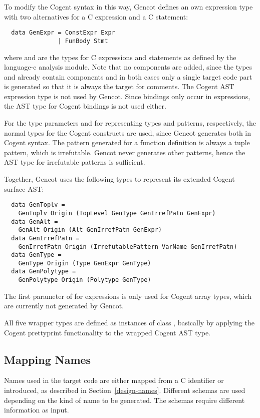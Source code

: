 To modify the Cogent syntax in this way, Gencot defines an own expression type with two alternatives for a C expression 
and a C statement:
\begin{verbatim}
  data GenExpr = ConstExpr Expr
               | FunBody Stmt
\end{verbatim}
where  and  are the types for C expressions and statements as defined by the language-c analysis
module. Note that no  components are added, since the types  and  already contain
 components and in both cases only a single target code part is generated so that it is always the
target for comments. The Cogent AST expression type is not used by Gencot. Since bindings only occur in expressions,
the AST type for Cogent bindings is not used either.

For the type parameters  and  for representing types and patterns, respectively, the normal types for 
the Cogent constructs are used, since Gencot generates both in Cogent syntax. The pattern generated for a function
definition is always a tuple pattern, which is irrefutable. Gencot never generates other patterns, hence the AST
type for irrefutable patterns is sufficient. 

Together, Gencot uses the following types to represent its extended Cogent surface AST:
\begin{verbatim}
  data GenToplv =
    GenToplv Origin (TopLevel GenType GenIrrefPatn GenExpr)
  data GenAlt =
    GenAlt Origin (Alt GenIrrefPatn GenExpr)
  data GenIrrefPatn = 
    GenIrrefPatn Origin (IrrefutablePattern VarName GenIrrefPatn)
  data GenType = 
    GenType Origin (Type GenExpr GenType)
  data GenPolytype = 
    GenPolytype Origin (Polytype GenType)
\end{verbatim}
The first parameter of  for expressions is only used for Cogent array types, which are currently 
not generated by Gencot.

All five wrapper types are defined as instances of class , basically by applying the Cogent prettyprint
functionality to the wrapped Cogent AST type.

\subsection{Mapping Names}
\label{impl-ccode-names}

Names used in the target code are either mapped from a C identifier or introduced, as described in 
Section~\ref{design-names}. Different schemas are used depending on the kind of name to be generated.
The schemas require different information as input.

